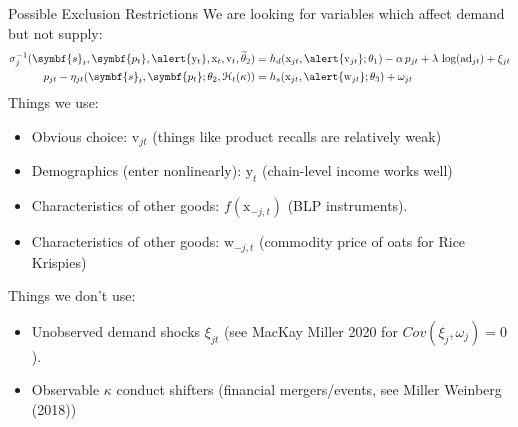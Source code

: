 \documentclass[aspectratio=169,10pt]{beamer}
\begin{document}
\begin{frame}{Possible Exclusion Restrictions}
We are looking for variables which affect \alert{demand but not supply}:
\begin{align*}
\sigma_{j}^{-1}(\symbf{s}_t, \symbf{p_t},\alert{\mathrm{y_t}}, \mathrm{x}_t,  \mathrm{v}_t, \widetilde{\theta}_2)
&= h_d(\mathrm{x}_{jt},\alert{ \mathrm{v}_{jt}}; \theta_1) - \alpha\, p_{jt} + \lambda \, \log(\text{ad}_{jt})+ \xi_{jt} \\
p_{jt} - \eta_{jt}(\symbf{s}_t, \symbf{p_t}; \theta_2, \mathcal{H}_t(\kappa))
&= h_s(\textrm{x}_{jt}, \alert{\mathrm{w}_{jt}}; \theta_3) + \omega_{jt} 
\end{align*}
Things we use:
\begin{itemize}
    \item Obvious choice: $\mathrm{v}_{jt}$ (things like product recalls are relatively weak)
    \item Demographics (enter nonlinearly): $\mathrm{y}_t$ (chain-level income works well)
    \item Characteristics of other goods: $f(\mathrm{x}_{-j,t})$ (BLP instruments).
    \item Characteristics of other goods: $\mathrm{w}_{-j,t}$ (commodity price of oats for Rice Krispies)
\end{itemize}
\pause
Things we don't use:
\begin{itemize}
    \item Unobserved demand shocks $\xi_{jt}$ (see MacKay Miller 2020 for $Cov(\xi_j,\omega_j)=0$).
    \item Observable $\kappa$ conduct shifters (financial mergers/events, see Miller Weinberg (2018))
\end{itemize}
\end{frame}
\end{document}
